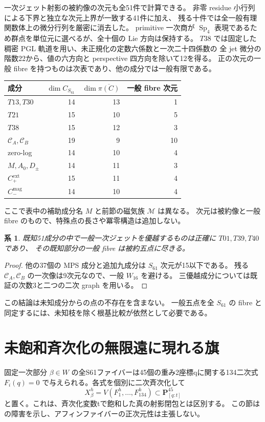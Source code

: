 \documentclass[11pt,a4paper]{ltjsarticle}
\newcommand{\PP}{\mathbf P}
\DeclareMathOperator{\Sp}{Sp}
\newtheorem{corollary}[theorem]{系}
\theoremstyle{remark}
\begin{document}
一次ジェット射影の被約像の次元も全51件で計算できる\cite{known51-jets-v62}。
非零 residue 小行列による下界と独立な次元上界が一致する41件に加え、
残る十件では全一般有理関数体上の微分行列を厳密に消去した。
primitive 一次商が $\Sp_4$ 表現であるため群点を単位元に選べるが、全十個の Lie 方向は保持する。
$T38$ では固定した稠密 PGL 軌道を用い、未正規化の定数六係数と一次二十四係数の
全 jet 微分の階数22から、値の六方向と perspective 四方向を除いて12を得る。
正の次元の一般 fibre を持つものは次表であり、他の成分では一般有限である。
\begin{center}
\begin{tabular}{lrrr}\toprule
成分 & $\dim C_{S_{61}}$ & $\dim\overline{\pi(C)}$ & 一般 fibre 次元\\\midrule
$T13,T30$ &14&13&1\\
$T21$ &15&10&5\\
$T38$ &15&12&3\\
$\mathcal C_A,\mathcal C_B$ &19&9&10\\
zero-log &14&10&4\\
$M,A_0,D_\pm$ &14&11&3\\
$C_+^{\mathrm{ext}}$ &15&11&4\\
$C_-^{\mathrm{mag}}$ &14&10&4\\\bottomrule
\end{tabular}
\end{center}
ここで表中の補助成分名 $M$ と前節の磁気族 $\mathcal M$ は異なる。
次元は被約像と一般 fibre のもので、特殊点の長さや冪零構造は追加しない。

\begin{corollary}
既知51成分の中で一般一次ジェットを優越するものは正確に $T01,T39,T40$ であり、
その既知部分の一般 fibre は被約五点に尽きる。
\end{corollary}
\begin{proof}
他の37個の MPS 成分と追加九成分は $S_{61}$ 次元が15以下である。
残る $\mathcal C_A,\mathcal C_B$ の一次像は9次元なので、一般 $W_{16}$ を避ける。
三優越成分については既証の次数3と二つの二次 graph を用いる。
\end{proof}
この結論は未知成分からの点の不存在を含まない。
一般五点を全 $S_{61}$ の fibre と同定するには、未知枝を除く根基比較が依然として必要である。

\section{未飽和斉次化の無限遠に現れる旗}\label{sec:infinity}
固定一次部分 $\beta\in W$ の全S61ファイバーは45個の重み2座標qに関する134二次式
$F_i(q)=0$ で与えられる。各式を個別に二次斉次化して
\[
 X_\beta^h=V(F_1^h,\ldots,F_{134}^h)\subset\PP^{45}_{[q:t]}
\]
と置く。これは、斉次化変数tで飽和した真の射影閉包とは区別する。
この節は\cite{infinity-certificate}の障害を示し、アフィンファイバーの正次元性は主張しない。
\end{document}
